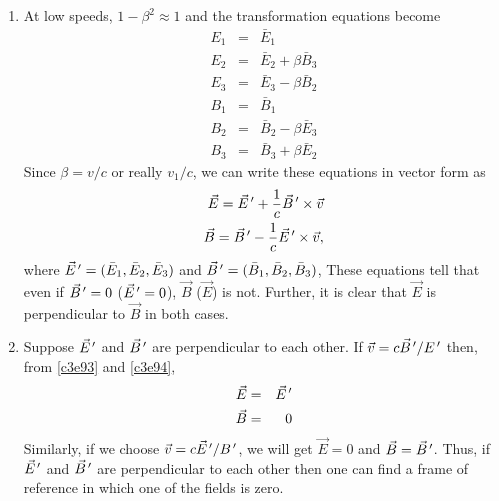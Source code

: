 \begin{enumerate}
\item At low speeds, $1 - \beta^2 \approx 1$ and the transformation equations
become
\begin{eqnarray}
E_1 &=& \bar{E}_1 \\ \label{c3e87}
E_2 &=& \bar{E}_2 + \beta\bar{B}_3 \\ \label{c3e88}
E_3 &=& \bar{E}_3 - \beta\bar{B}_2 \\ \label{c3e89}
B_1 &=& \bar{B}_1 \\ \label{c3e90}
B_2 &=& \bar{B}_2 - \beta\bar{E}_3 \\ \label{c3e92}
B_3 &=& \bar{B}_3 + \beta\bar{E}_2 \label{c3e92}
\end{eqnarray}
Since $\beta = v/c$ or really $v_1/c$, we can write these equations in vector form as
\begin{eqnarray}
\vec{E} = \vec{E}^{\,\prime} + \frac{1}{c}\vec{B}^{\,\prime} \times \vec{v} \label{c3e93} \\
\vec{B} = \vec{B}^{\,\prime} - \frac{1}{c}\vec{E}^{\,\prime} \times \vec{v}, \label{c3e94}
\end{eqnarray}
where $\vec{E}^{\,\prime} = (\bar{E}_1, \bar{E}_2, \bar{E}_3)$ and $\vec{B}^{\,\prime} = 
(\bar{B}_1, \bar{B}_2, \bar{B}_3)$, These equations tell that even if $\vec{B}^{\,\prime}
= 0$ ($\vec{E}^{\,\prime} = 0$), $\vec{B}$ ($\vec{E}$) is not. Further, it is clear that
$\vec{E}$ is perpendicular to $\vec{B}$ in both cases.

\item Suppose $\vec{E}^{\,\prime}$ and $\vec{B}^{\,\prime}$ are perpendicular to each other.
If $\vec{v} = c\vec{B}^{\,\prime}/E^{\,\prime}$ then, from \eqref{c3e93} and \eqref{c3e94},
\begin{eqnarray}
\vec{E} &=& \vec{E}^{\,\prime} \label{c3e95} \\
\vec{B} &=& 0 \label{c3e96}
\end{eqnarray}
Similarly, if we choose $\vec{v} = c\vec{E}^{\,\prime}/B^{\,\prime}$, we will get $\vec{E} = 0$
and $\vec{B} = \vec{B}^{\,\prime}$. Thus, if $\vec{E}^{\,\prime}$ and $\vec{B}^{\,\prime}$ are 
perpendicular to each other then one can find a frame of reference in which one
of the fields is zero.


\end{enumerate}
